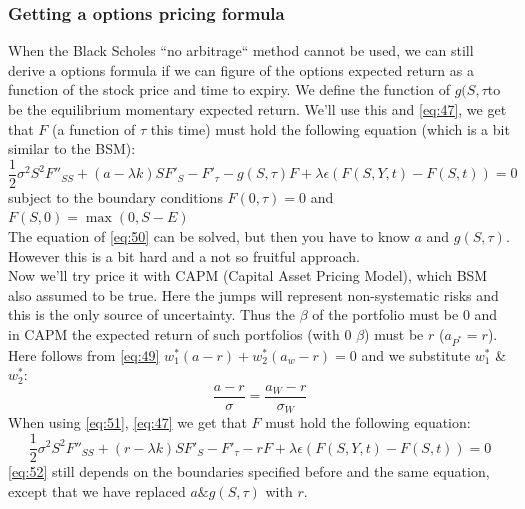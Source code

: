 \documentclass{article}
\begin{document}
\subsubsection{Getting a options pricing formula}
When the Black Scholes “no arbitrage“ method cannot be used, we can still derive a options formula if we can figure of the options expected return as a function of the stock price and time to expiry. We define the function of $g(S, \tau $to be the equilibrium momentary expected return. We’ll use this and \ref{eq:47}, we get that $F$ (a function of $\tau$ this time) must hold the following equation (which is a bit similar to the BSM):
\begin{equation} \label{eq:50}
    \frac{1}{2}\sigma^{2}S^{2}F''_{SS} + (a - \lambda k)SF'_{S} - F'_{\tau} - g(S,\tau)F + \lambda \epsilon (F(S,Y,t) - F(S,t)) = 0
\end{equation}
subject to the boundary conditions $F(0, \tau) = 0$ and $F(S, 0) = \max(0, S - E)$ \\ [2ex]
The equation of \ref{eq:50} can be solved, but then you have to know $a$ and $g(S, \tau)$. However this is a bit hard and a not so fruitful approach. \\
Now we’ll try price it with CAPM (Capital Asset Pricing Model), which BSM also assumed to be true. Here the jumps will represent non-systematic risks and this is the only source of uncertainty. Thus the $\beta$ of the portfolio must be 0 and in CAPM the expected return of such portfolios (with 0 $\beta$) must be $r$ ($a_{P^{*}} = r$). Here follows from \ref{eq:49} $w_{1}^{*}(a - r) + w_{2}^{*}(a_{w} -r) = 0$ and we substitute $w_{1}^{*}$ \& $w_{2}^{*}$:
\begin{equation} \label{eq:51}
    \frac{a-r}{\sigma} = \frac{a_{W}-r}{\sigma_{W}}
\end{equation}
When using \ref{eq:51}, \ref{eq:47} we get that $F$ must hold the following equation:
\begin{equation} \label{eq:52}
    \frac{1}{2}\sigma^{2}S^{2}F''_{SS} + (r - \lambda k)SF'_{S} - F'_{\tau} - rF + \lambda \epsilon (F(S,Y,t) - F(S,t)) = 0
\end{equation}
\ref{eq:52} still depends on the boundaries specified before and the same equation, except that we have replaced $a \& g(S, \tau)$ with $r$.
\end{document}
